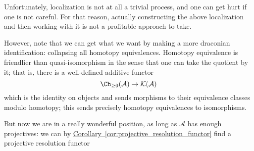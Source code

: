 \documentclass[main.tex]{subfiles}
\begin{document}
Unfortunately, localization is not at all a trivial process, and one can get hurt if one is not careful. For that reason, actually constructing the above localization and then working with it is not a profitable approach to take.

However, note that we can get what we want by making a more draconian identification: collapsing all homotopy equivalences. Homotopy equivalence is friendlier than quasi-isomorphism in the sense that one can take the quotient by it; that is, there is a well-defined additive functor
\begin{equation*}
  \Ch_{\geq 0}(\mathcal{A}) \to \mathcal{K}(\mathcal{A})
\end{equation*}
which is the identity on objects and sends morphisms to their equivalence classes modulo homotopy; this sends precisely homotopy equivalences to isomorphisms.

But now we are in a really wonderful position, as long as $\mathcal{A}$ has enough projectives: we can by \hyperref[cor:projective_resolution_functor]{Corollary~\ref*{cor:projective_resolution_functor}} find a projective resolution functor
\end{document}
